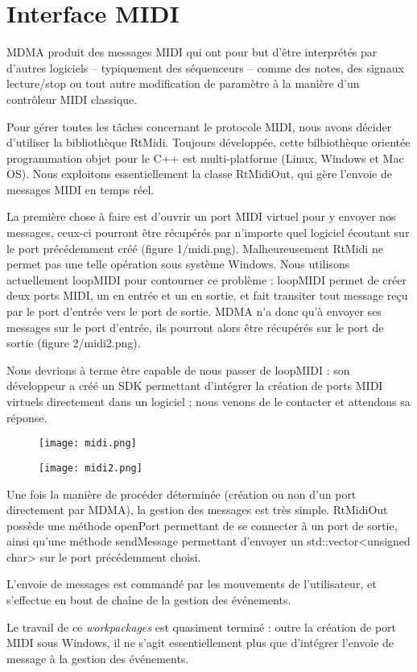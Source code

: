 \section{Interface MIDI}
\par MDMA produit des messages MIDI qui ont pour but d'être interprétés par d'autres logiciels  – typiquement des séquenceurs – comme des notes, des signaux lecture/stop ou tout autre modification de paramètre à la manière d'un contrôleur MIDI classique.
\par Pour gérer toutes les tâches concernant le protocole MIDI, nous avons décider d'utiliser la bibliothèque RtMidi. Toujours développée, cette bilbiothèque orientée programmation objet pour le C++ est multi-platforme (Linux, Windows et Mac OS). Nous exploitons essentiellement la classe RtMidiOut, qui gère l'envoie de messages MIDI en temps réel.
\par La première chose à faire est d'ouvrir un port MIDI virtuel pour y envoyer nos messages, ceux-ci pourront être récupérés par n'importe quel logiciel écoutant sur le port précédemment créé (figure 1/midi.png). Malheureusement RtMidi ne permet pas une telle opération sous système Windows. Nous utilisons actuellement loopMIDI pour contourner ce problème : loopMIDI permet de créer deux ports MIDI, un en entrée et un en sortie, et fait transiter tout message reçu par le port d'entrée vers le port de sortie. MDMA n'a donc qu'à envoyer ses messages sur le port d'entrée, ils pourront alors être récupérés sur le port de sortie (figure 2/midi2.png).
\par Nous devrions à terme être capable de nous passer de loopMIDI : son développeur a créé un SDK permettant d'intégrer la création de ports MIDI virtuels directement dans un logiciel ; nous venons de le contacter et attendons sa réponse.
\begin{figure}
	\centering
	\texttt{[image: midi.png]}
\end{figure}
\begin{figure}
	\centering
	\texttt{[image: midi2.png]}
\end{figure}
\par Une fois la manière de procéder déterminée (création ou non d'un port directement par MDMA), la gestion des messages est très simple. RtMidiOut possède une méthode openPort permettant de se connecter à un port de sortie, ainsi qu'une méthode sendMessage permettant d'envoyer un std::vector<unsigned char> sur le port précédemment choisi.
\par L'envoie de messages est commandé par les mouvements de l'utilisateur, et s'effectue en bout de chaîne de la gestion des événements.
\par Le travail de ce \emph{workpackages} est quasiment terminé : outre la création de port MIDI sous Windows, il ne s'agit essentiellement plus que d'intégrer l'envoie de message à la gestion des événements.



